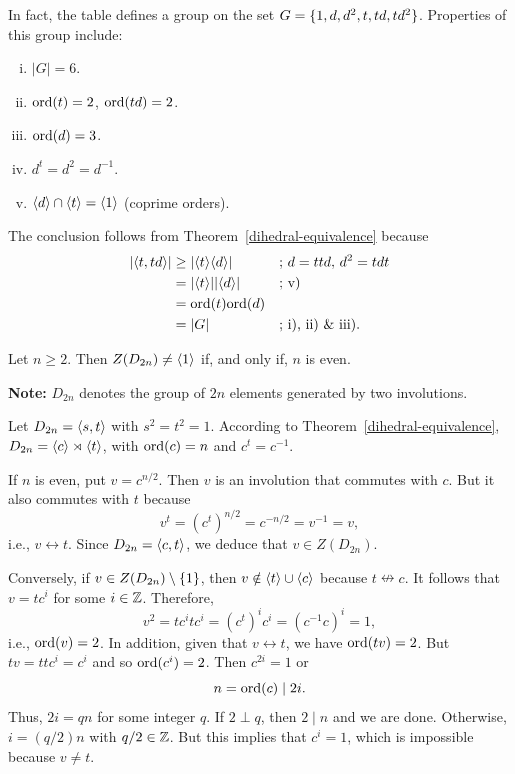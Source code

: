 \begin{solution}
    In fact, the table defines a group on the set\/ $G=\{1, d, d^2, t, td, td^2\}$. Properties of this group include:
    \begin{enumerate}[i),font=\upshape]
        \item $|G|=6$.
        \item ${\rm ord}(t)=2$, ${\rm ord}(td)=2$.
        \item ${\rm ord}(d)=3$.
        \item $d^t=d^2=d^{-1}$.
        \item $\langle d\rangle\cap\langle t\rangle=\langle1\rangle$ (coprime orders).
    \end{enumerate}
    The conclusion follows from Theorem~\ref{dihedral-equivalence} because
        \begin{align*}
            |\langle t,td\rangle|&\ge|\langle t\rangle\langle d\rangle|  &&\text{; } d=ttd,\,d^2=tdt\\
                &=|\langle t\rangle||\langle d\rangle| &&\text{; v)}\\
                &= {\rm ord}(t){\rm ord}(d)\\
                &= |G|  &&\text{; i), ii) \&\ iii)}.
        \end{align*}
      \end{solution}    

\begin{exr}\label{exercise-1.6.6}
    Let\/ $n \geq 2$. Then\/ $Z(D_{2n}) \ne\langle1\rangle$ if, and only if, $n$ is even.

    \textrm{\normalfont\textbf{Note:} $D_{2n}$ denotes the group of $2n$ elements generated by two involutions.}
\end{exr}

\begin{solution} Let $D_{2n}=\langle s,t\rangle$ with $s^2=t^2=1$. According to Theorem~\ref{dihedral-equivalence}, $D_{2n}=\langle c\rangle\rtimes\langle t\rangle$, with ${\rm ord}(c)=n$ and $c^t=c^{-1}$.

If $n$ is even, put $v=c^{n/2}$. Then $v$ is an involution that commutes with $c$. But it also commutes with $t$ because
$$
    v^t = (c^t)^{n/2} = c^{-n/2} = v^{-1} = v,
$$
i.e., $v\leftrightarrow t$. Since $D_{2n}=\langle c,t\rangle$, we deduce that $v\in Z(D_{2n})$.

Conversely, if $v\in Z(D_{2n})\setminus\{1\}$, then $v\notin\langle t\rangle\cup\langle c\rangle$ because $t\nleftrightarrow c$. It follows that $v=tc^i$ for some $i\in\mathbb{Z}$. Therefore,
$$
    v^2 = tc^itc^i=(c^t)^ic^i=(c^{-1}c)^i = 1,
$$
i.e., ${\rm ord}(v)=2$. In addition, given that $v\leftrightarrow t$, we have ${\rm ord}(tv)=2$. But $tv=ttc^i=c^i$ and so ${\rm ord}(c^i)=2$. Then $c^{2i}=1$ or
$$
    n={\rm ord}(c)\mid 2i.
$$
Thus, $2i=qn$ for some integer $q$. If $2\perp q$, then $2\mid n$ and we are done. Otherwise, $i=(q/2)n$ with $q/2\in\mathbb{Z}$. But this implies that $c^i=1$, which is impossible because $v\ne t$.  \end{solution}

